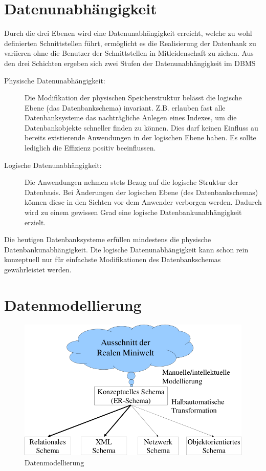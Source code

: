 \section{Datenunabhängigkeit}
Durch die drei Ebenen wird eine Datenunabhängigkeit erreicht, welche zu wohl definierten Schnittstellen führt, ermöglicht es die Realisierung der Datenbank zu variieren ohne die Benutzer der Schnittstellen in Mitleidenschaft zu ziehen. Aus den drei Schichten ergeben sich zwei Stufen der Datenunabhängigkeit im DBMS

\begin{description}

\item[Physische Datenunabhängigkeit:] Die Modifikation der physischen Speicherstruktur belässt die logische Ebene (das Datenbankschema) invariant. Z.B. erlauben fast alle Datenbanksysteme das nachträgliche Anlegen eines Indexes, um die Datenbankobjekte schneller finden zu können. Dies darf keinen Einfluss au bereits existierende Anwendungen in der logischen Ebene haben. Es sollte lediglich die Effizienz positiv beeinflussen.
\item[Logische Datenunabhängigkeit:] Die Anwendungen nehmen stets Bezug auf die logische Struktur der Datenbasis. Bei Änderungen der logischen Ebene (des Datenbankschemas) können diese in den Sichten vor dem Anwender verborgen werden. Dadurch wird zu einem gewissen Grad eine logische Datenbankunabhängigkeit erzielt. 

\end{description}

Die heutigen Datenbanksysteme erfüllen mindestens die physische Datenbankunabhängigkeit. Die logische Datenunabhängigkeit kann schon rein konzeptuell nur für einfachste Modifikationen des Datenbankschemas gewährleistet werden. 

\section{Datenmodellierung}

\begin{figure}[h!]
\centering
\includegraphics[width=0.55\linewidth]{./mainmatter/pics/modell}
\caption{Datenmodellierung}
\label{fig:modell}
\end{figure}

